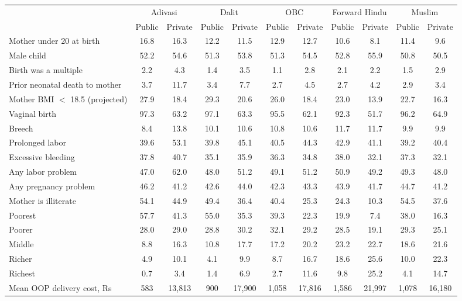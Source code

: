 \begin{tabular}{lcccccccccc}
\hline
 & \multicolumn{2}{c}{Adivasi} & \multicolumn{2}{c}{Dalit} & \multicolumn{2}{c}{OBC} & \multicolumn{2}{c}{Forward Hindu} & \multicolumn{2}{c}{Muslim} \\
 & Public & Private & Public & Private & Public & Private & Public & Private & Public & Private \\
\hline
Mother under 20 at birth&16.8&16.3&12.2&11.5&12.9&12.7&10.6&8.1&11.4&9.6\\
Male child&52.2&54.6&51.3&53.8&51.3&54.5&52.8&55.9&50.8&50.5\\
Birth was a multiple&2.2&4.3&1.4&3.5&1.1&2.8&2.1&2.2&1.5&2.9\\
Prior neonatal death to mother&3.7&11.7&3.4&7.7&2.7&4.5&2.7&4.2&2.9&3.4\\
Mother BMI $<$ 18.5 (projected)&27.9&18.4&29.3&20.6&26.0&18.4&23.0&13.9&22.7&16.3\\
Vaginal birth&97.3&63.2&97.1&63.3&95.5&62.1&92.3&51.7&96.2&64.9\\
Breech&8.4&13.8&10.1&10.6&10.8&10.6&11.7&11.7&9.9&9.9\\
Prolonged labor&39.6&53.1&39.8&45.1&40.5&44.3&42.9&41.1&39.2&40.4\\
Excessive bleeding&37.8&40.7&35.1&35.9&36.3&34.8&38.0&32.1&37.3&32.1\\
Any labor problem&47.0&62.0&48.0&51.2&49.1&51.2&50.9&49.2&49.3&48.0\\
Any pregnancy problem&46.2&41.2&42.6&44.0&42.3&43.3&43.9&41.7&44.7&41.2\\
Mother is illiterate&54.1&44.9&49.4&36.4&40.4&25.3&24.3&10.3&54.5&37.6\\
Poorest&57.7&41.3&55.0&35.3&39.3&22.3&19.9&7.4&38.0&16.3\\
Poorer&28.0&29.0&28.8&30.2&32.1&29.2&28.5&19.1&29.3&25.1\\
Middle&8.8&16.3&10.8&17.7&17.2&20.2&23.2&22.7&18.6&21.6\\
Richer&4.9&10.1&4.1&9.9&8.7&16.7&18.6&25.6&10.0&22.3\\
Richest&0.7&3.4&1.4&6.9&2.7&11.6&9.8&25.2&4.1&14.7\\
Mean OOP delivery cost, Rs&583&13,813&900&17,900&1,058&17,816&1,586&21,997&1,078&16,180\\
\hline
\end{tabular}
